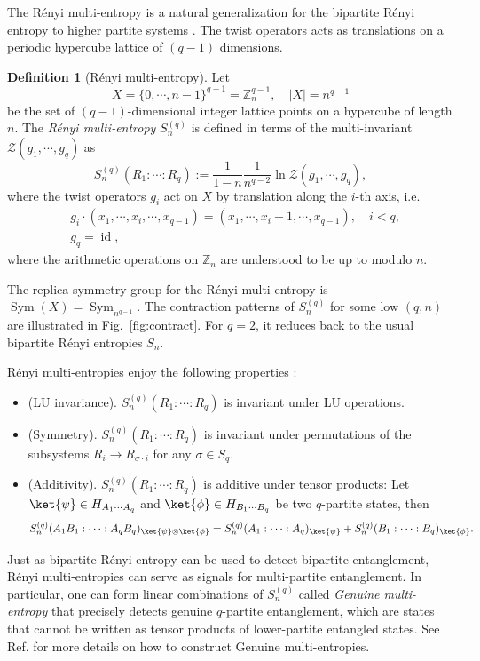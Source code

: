 \documentclass[11pt,oneside,letterpaper]{article}
\numberwithin{equation}{section}
\theoremstyle{definition}
\newtheorem{definition}[theorem]{Definition}
\theoremstyle{remark}
\DeclareMathOperator{\id}{id}
\DeclareMathOperator{\Sym}{Sym}
\begin{document}
The R\'enyi multi-entropy is a natural generalization for the bipartite R\'enyi entropy to higher partite systems \cite{Gadde:2022cqi}. The twist operators acts as translations on a periodic hypercube lattice of $(q-1)$ dimensions.
\begin{definition}[R\'enyi multi-entropy]
\label{def:mutli_ent}
  Let
  \begin{equation}
     X=\{0,\cdots,n-1\}^{q-1}=\mathbb{Z}_n^{q-1},\quad |X|=n^{q-1}
  \end{equation}
  be the set of $(q-1)$-dimensional integer lattice points on a hypercube of length $n$. The \emph{R\'enyi multi-entropy} $S^{(q)}_n$ is defined in terms of the multi-invariant $\mathcal{Z}(g_1,\cdots,g_q)$ as
  \begin{equation}
    S^{(q)}_n(R_1:\cdots :R_q) := \frac{1}{1-n}\frac{1}{n^{q-2}} \ln \mathcal{Z}(g_1,\cdots,g_q),
  \end{equation}
  where the twist operators $g_i$ act on $X$ by translation along the $i$-th axis, i.e.
  \begin{align}
    &g_i \cdot (x_1, \cdots ,x_i,\cdots,x_{q-1}) = (x_1, \cdots ,x_i+1,\cdots,x_{q-1}),\quad  i<q, \\
    &g_q = \id,
  \end{align}
   where the arithmetic operations on $\mathbb{Z}_n$ are understood to be up to modulo $n$.
 \end{definition}
 The replica symmetry group for the R\'enyi multi-entropy is $\Sym(X)=\Sym_{n^{q-1}}$. The contraction patterns of $S^{(q)}_n$ for some low $(q,n)$ are illustrated in Fig.~\ref{fig:contract}. For $q=2$, it reduces back to the usual bipartite R\'enyi entropies $S_n$.

R\'enyi multi-entropies enjoy the following properties \cite{Gadde:2022cqi,Gadde:2023zni}:
 \begin{itemize}
 \item (LU invariance). $S^{(q)}_n(R_1:\cdots:R_q)$ is invariant under LU operations.
 \item (Symmetry). $S^{(q)}_n(R_1:\cdots:R_q)$ is invariant under permutations of the subsystems $R_i\to R_{\sigma\cdot i}$ for any $\sigma\in S_q$.
 \item (Additivity). $S^{(q)}_n(R_1:\cdots:R_q)$ is additive under tensor products: Let $\ket{\psi}\in H_{A_1\cdots A_q}$ and $\ket{\phi}\in H_{B_1\cdots B_q}$ be two $q$-partite states, then
   \begin{equation}
     S^{(q)}_n(A_1B_1:\cdots:A_qB_q)_{\ket{\psi}\otimes \ket{\phi}} = S^{(q)}_n(A_1:\cdots:A_q)_{\ket{\psi}} + S^{(q)}_n(B_1:\cdots:B_q)_{\ket{\phi}}.
   \end{equation}
 \end{itemize}
 Just as bipartite R\'enyi entropy can be used to detect bipartite entanglement, R\'enyi multi-entropies can serve as signals for multi-partite entanglement. In particular, one can form linear combinations of $S^{(q)}_n$ called \emph{Genuine multi-entropy} that precisely detects genuine $q$-partite entanglement, which are states that cannot be written as tensor products of lower-partite entangled states. See Ref. \cite{Iizuka:2025ioc,Iizuka:2025caq} for more details on how to construct Genuine multi-entropies.
\end{document}
